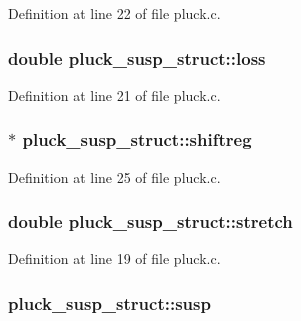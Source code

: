 Definition at line 22 of file pluck.\+c.

\subsubsection[{\texorpdfstring{loss}{loss}}]{\setlength{\rightskip}{0pt plus 5cm}double pluck\+\_\+susp\+\_\+struct\+::loss}\hypertarget{structpluck__susp__struct_a684f13eeaed04cd7428a8bcd6f1b9fa8}{}\label{structpluck__susp__struct_a684f13eeaed04cd7428a8bcd6f1b9fa8}


Definition at line 21 of file pluck.\+c.

\subsubsection[{\texorpdfstring{shiftreg}{shiftreg}}]{$\ast$ pluck\+\_\+susp\+\_\+struct\+::shiftreg}\hypertarget{structpluck__susp__struct_a963ca97fda5c61c72337cef49b6ff282}{}\label{structpluck__susp__struct_a963ca97fda5c61c72337cef49b6ff282}


Definition at line 25 of file pluck.\+c.

\subsubsection[{\texorpdfstring{stretch}{stretch}}]{\setlength{\rightskip}{0pt plus 5cm}double pluck\+\_\+susp\+\_\+struct\+::stretch}\hypertarget{structpluck__susp__struct_aa168cd3a305b26ad68c8b214c9f0a11f}{}\label{structpluck__susp__struct_aa168cd3a305b26ad68c8b214c9f0a11f}


Definition at line 19 of file pluck.\+c.

\subsubsection[{\texorpdfstring{susp}{susp}}]{ pluck\+\_\+susp\+\_\+struct\+::susp}\hypertarget{structpluck__susp__struct_a0bf0187ba222ad63316166614b8370c5}{}\label{structpluck__susp__struct_a0bf0187ba222ad63316166614b8370c5}


